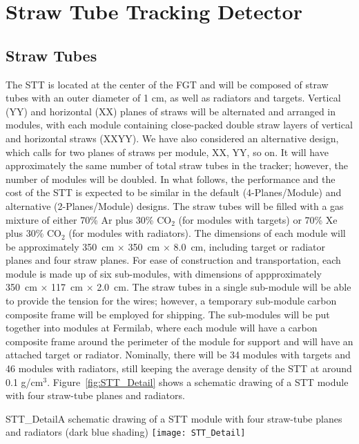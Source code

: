 \section{Straw Tube Tracking Detector}

\subsection{Straw Tubes}

The STT is located at the center of the FGT and 
will be composed of straw tubes with an outer diameter of 1 cm, as well as 
radiators and targets. 
Vertical (YY) and horizontal (XX) planes of straws will be alternated and 
arranged in modules, with each module containing close-packed double straw layers 
of vertical and horizontal straws (XXYY). 
We have also considered an alternative design, which calls for two planes of straws
per module, XX, YY, so on. It will have approximately the same number of
total straw tubes in the tracker; however, the number of modules will be doubled.
In what follows, the performance and the cost of the STT is expected to be similar 
in the default (4-Planes/Module) and alternative (2-Planes/Module) designs.
The straw tubes will be filled with a
gas mixture of either 70\% Ar plus 30\% CO$_2$ (for modules with targets) or
70\% Xe plus 30\% CO$_2$ (for modules with radiators).
The dimensions of each module will
be approximately 350~cm $\times$ 350~cm $\times$ 8.0~cm, including 
target or radiator planes and four straw planes. For ease of construction and
transportation, each module is made up of six sub-modules, with dimensions of
appproximately 350~cm $\times$ 117~cm $\times$ 2.0~cm. 
The straw tubes in a single sub-module will be able to provide the tension 
for the wires; however, a temporary sub-module carbon composite frame will 
be employed for shipping. The sub-modules will be put together into modules 
at Fermilab, where each module will have a carbon composite frame around 
the perimeter of the module for support and will have an attached target or 
radiator. Nominally, there will be 34 modules with targets and 46 modules 
with radiators, still keeping the 
average density of the STT at around 0.1 g/cm$^3$. Figure~\ref{fig:STT_Detail}
shows a schematic drawing of a STT module with four straw-tube planes and
radiators.


\begin{cdrfigure}{STT_Detail}{A schematic drawing of a STT module with four straw-tube planes and
radiators (dark blue shading)}
\texttt{[image: STT\_Detail]}
\end{cdrfigure}

